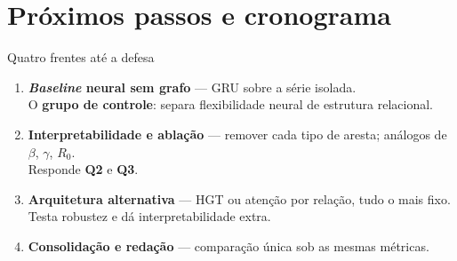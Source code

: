 \documentclass[aspectratio=169]{beamer}
\newcommand{\dest}[1]{\textcolor{ufprB}{\textbf{#1}}}
\newcommand{\azul}[1]{\textcolor{ufprA}{\textbf{#1}}}
\begin{document}
\section{Próximos passos e cronograma}

\begin{frame}{Quatro frentes até a defesa}
  \vfill
  \begin{enumerate}
    \item \azul{\emph{Baseline} neural sem grafo} --- GRU sobre a série isolada.\\
      {\small O \dest{grupo de controle}: separa flexibilidade neural de estrutura relacional.}
    \item \azul{Interpretabilidade e ablação} --- remover cada tipo de aresta; análogos de
      $\beta$, $\gamma$, $R_0$.\\
      {\small Responde \dest{Q2} e \dest{Q3}.}
    \item \azul{Arquitetura alternativa} --- HGT ou atenção por relação, tudo o mais fixo.\\
      {\small Testa robustez e dá interpretabilidade extra.}
    \item \azul{Consolidação e redação} --- comparação única sob as mesmas métricas.
  \end{enumerate}
  \vfill
\end{frame}
\end{document}
